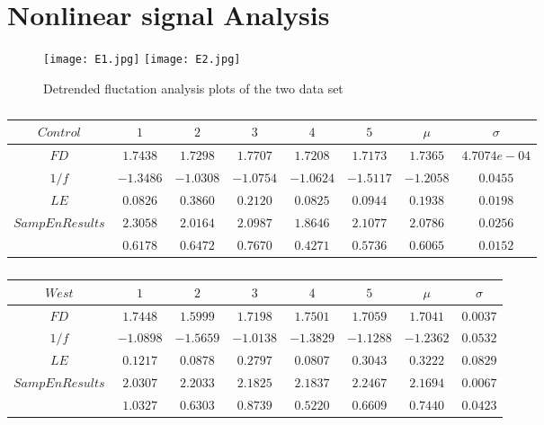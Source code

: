 \section{Nonlinear signal Analysis}



\begin{figure}[!htbp]
%
\centering
\texttt{[image: E1.jpg]}
\label{figa}
\endminipage\hfill
{}%
\centering
\texttt{[image: E2.jpg]}
\label{figb}
\endminipage\hfill
\caption{Detrended fluctation analysis plots of the two data set}
\end{figure}


\begin{table}[!htbp]
\centering
\caption{}\label{c1}
\begin{tabular}{ c c c c c c c c} 
\hline
$Control$&$1$&$2$&$3$&$4$&$5$&$\mu$&$\sigma$\\
\hline
$FD $&$1.7438$&$1.7298$&$1.7707$&$1.7208$&$1.7173$&$ 1.7365$&$ 4.7074e-04$\\
$1/f$&$-1.3486$&$-1.0308$&$-1.0754$&$-1.0624$&$-1.5117$&$-1.2058$&$ 0.0455$\\
$LE$&$0.0826$&$0.3860$&$0.2120$&$0.0825$&$0.0944$&$0.1938$&$0.0198$\\
$SampEnResults$&$2.3058$&$2.0164$&$2.0987$&$1.8646$&$2.1077$&$2.0786$&$0.0256$\\
&$0.6178$&$0.6472$&$0.7670$&$0.4271$&$0.5736$&$0.6065$&$0.0152$\\
\hline 
\end{tabular}
\end{table}

\begin{table}[!htbp]
\centering
\caption{}\label{c2}
\begin{tabular}{ c c c c c c c c} 
\hline
$West$&$1$&$2$&$3$&$4$&$5$&$\mu$&$\sigma$\\
\hline
$FD$&$1.7448$&$1.5999$&$1.7198$&$1.7501$&$1.7059$&$ 1.7041$&$ 0.0037$\\
$1/f$&$-1.0898$&$-1.5659$&$-1.0138$&$-1.3829$&$-1.1288$&$-1.2362$&$ 0.0532$\\
$LE$&$0.1217$&$0.0878$&$0.2797$&$0.0807$&$0.3043$&$0.3222$&$0.0829$\\  
$SampEnResults$&$2.0307$&$2.2033$&$2.1825$&$2.1837$&$2.2467$&$2.1694$&$0.0067$\\
&$1.0327$&$0.6303$&$0.8739$&$0.5220$&$0.6609$&$ 0.7440$&$0.0423$\\
\hline 
\end{tabular}
\end{table}

